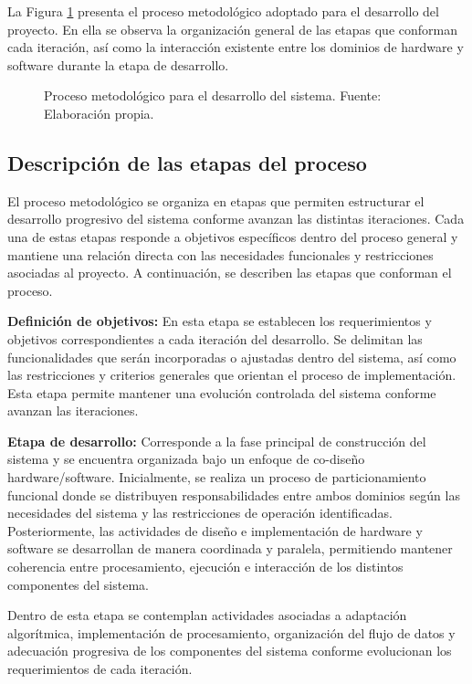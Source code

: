 La Figura \ref{fig:metodologia2} presenta el proceso metodológico adoptado para el desarrollo del proyecto. En ella se observa la organización general de las etapas que conforman cada iteración, así como la interacción existente entre los dominios de hardware y software durante la etapa de desarrollo.

\begin{figure}[H]
\centering
\resizebox{\textwidth}{!}{
    \shorthandoff{<>}
    
    \shorthandon{<>}
}
\caption{Proceso metodológico para el desarrollo del sistema. Fuente: Elaboración propia.}
\label{fig:metodologia2}
\end{figure}

\subsection{Descripción de las etapas del proceso}

El proceso metodológico se organiza en etapas que permiten estructurar el desarrollo progresivo del sistema conforme avanzan las distintas iteraciones. Cada una de estas etapas responde a objetivos específicos dentro del proceso general y mantiene una relación directa con las necesidades funcionales y restricciones asociadas al proyecto. A continuación, se describen las etapas que conforman el proceso.

\textbf{Definición de objetivos:}
En esta etapa se establecen los requerimientos y objetivos correspondientes a cada iteración del desarrollo. Se delimitan las funcionalidades que serán incorporadas o ajustadas dentro del sistema, así como las restricciones y criterios generales que orientan el proceso de implementación. Esta etapa permite mantener una evolución controlada del sistema conforme avanzan las iteraciones.

\textbf{Etapa de desarrollo:}
Corresponde a la fase principal de construcción del sistema y se encuentra organizada bajo un enfoque de co-diseño hardware/software. Inicialmente, se realiza un proceso de particionamiento funcional donde se distribuyen responsabilidades entre ambos dominios según las necesidades del sistema y las restricciones de operación identificadas. Posteriormente, las actividades de diseño e implementación de hardware y software se desarrollan de manera coordinada y paralela, permitiendo mantener coherencia entre procesamiento, ejecución e interacción de los distintos componentes del sistema.

Dentro de esta etapa se contemplan actividades asociadas a adaptación algorítmica, implementación de procesamiento, organización del flujo de datos y adecuación progresiva de los componentes del sistema conforme evolucionan los requerimientos de cada iteración.


